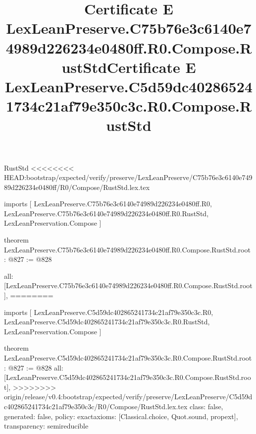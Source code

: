\begin{lexlean}{RustStd}
<<<<<<<< HEAD:bootstrap/expected/verify/preserve/LexLeanPreserve/C75b76e3c6140e74989d226234e0480ff/R0/Compose/RustStd.lex.tex
\title{Certificate E LexLeanPreserve.C75b76e3c6140e74989d226234e0480ff.R0.Compose.RustStd}
\begin{coremodule}
imports [
  LexLeanPreserve.C75b76e3c6140e74989d226234e0480ff.R0,
  LexLeanPreserve.C75b76e3c6140e74989d226234e0480ff.R0.RustStd,
  LexLeanPreservation.Compose
]

theorem LexLeanPreserve.C75b76e3c6140e74989d226234e0480ff.R0.Compose.RustStd.root : @827 := @828 {
  all: [LexLeanPreserve.C75b76e3c6140e74989d226234e0480ff.R0.Compose.RustStd.root],
========
\title{Certificate E LexLeanPreserve.C5d59dc402865241734c21af79e350c3c.R0.Compose.RustStd}
\begin{coremodule}
imports [
  LexLeanPreserve.C5d59dc402865241734c21af79e350c3c.R0,
  LexLeanPreserve.C5d59dc402865241734c21af79e350c3c.R0.RustStd,
  LexLeanPreservation.Compose
]

theorem LexLeanPreserve.C5d59dc402865241734c21af79e350c3c.R0.Compose.RustStd.root : @827 := @828 {
  all: [LexLeanPreserve.C5d59dc402865241734c21af79e350c3c.R0.Compose.RustStd.root],
>>>>>>>> origin/release/v0.4:bootstrap/expected/verify/preserve/LexLeanPreserve/C5d59dc402865241734c21af79e350c3c/R0/Compose/RustStd.lex.tex
  class: false,
  generated: false,
  policy: exact{axioms: [Classical.choice, Quot.sound, propext]},
  transparency: semireducible
}


\end{coremodule}}
\end{coremodule}
\end{lexlean}
